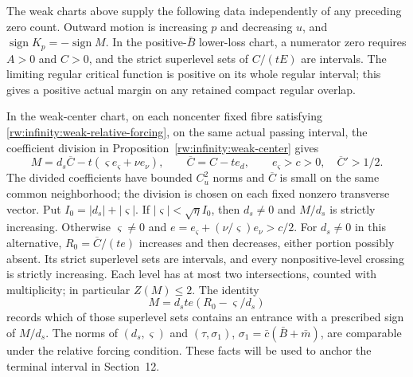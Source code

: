 \begin{lemma}
\label{rw:infinity:weak-entry-data}
The weak charts above supply the following data independently of any
preceding zero count. Outward motion is increasing $p$ and decreasing
$u$, and $\operatorname{sign}K_p=-\operatorname{sign}M$.
In the positive-$\bar B$ lower-loss chart, a numerator zero requires
$A>0$ and $C>0$, and the strict superlevel sets of $C/(tE)$ are
intervals. The limiting regular critical function is positive on
its whole regular interval; this gives a positive actual margin on
any retained compact regular overlap.

In the weak-center chart, on each noncenter fixed fibre satisfying
\eqref{rw:infinity:weak-relative-forcing}, on the same actual passing
interval, the coefficient division in
Proposition~\ref{rw:infinity:weak-center} gives
\[
 M=d_s\overline C-t(\varsigma e_\varsigma+\nu e_\nu),
 \qquad \overline C=C-te_d,\qquad
 e_\varsigma>c>0,\quad\overline C'>1/2.
\]
The divided coefficients have bounded $C_u^2$ norms and
$\overline C$ is small on the same common neighborhood; the division
is chosen on each fixed nonzero transverse vector.
Put $I_0=|d_s|+|\varsigma|$. If
$|\varsigma|<\sqrt\eta I_0$, then $d_s\ne0$ and $M/d_s$ is
strictly increasing. Otherwise $\varsigma\ne0$ and
$e=e_\varsigma+(\nu/\varsigma)e_\nu>c/2$.
For $d_s\ne0$ in this alternative, $R_0=\overline C/(te)$
increases and then decreases, either portion possibly absent.
Its strict superlevel sets are intervals, and every nonpositive-level
crossing is strictly increasing. Each level has at most two
intersections, counted with multiplicity; in particular $Z(M)\le2$.
The identity
\[
 M=d_s t e(R_0-\varsigma/d_s)
\]
records which of those superlevel sets contains an entrance with a
prescribed sign of $M/d_s$. The norms of $(d_s,\varsigma)$ and
$(\tau,\sigma_1)$, $\sigma_1=\bar c(\bar B+\bar m)$, are
comparable under the relative forcing condition. These facts will
be used to anchor the terminal interval in Section~12.
\end{lemma}
